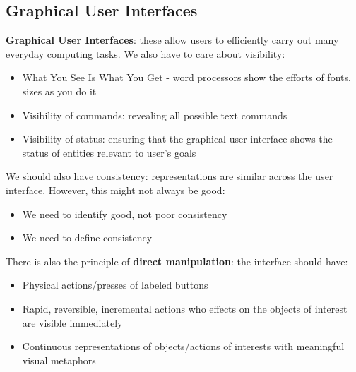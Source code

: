 \documentclass{article}
\begin{document}
\subsection{Graphical User Interfaces}
\textbf{Graphical User Interfaces}: these allow users to efficiently carry out many everyday computing tasks. We also have to care about visibility:
\begin{itemize}
    \item What You See Is What You Get - word processors show the efforts of fonts, sizes as you do it
    \item Visibility of commands: revealing all possible text commands
    \item Visibility of status: ensuring that the graphical user interface shows the status of entities relevant to user's goals
\end{itemize}
We should also have consistency: representations are similar across the user interface. However, this might not always be good:
\begin{itemize}
    \item We need to identify good, not poor consistency
    \item We need to define consistency
\end{itemize}
There is also the principle of \textbf{direct manipulation}: the interface should have:
\begin{itemize}
    \item Physical actions/presses of labeled buttons
    \item Rapid, reversible, incremental actions who effects on the objects of interest are visible immediately
    \item Continuous representations of objects/actions of interests with meaningful visual metaphors
\end{itemize}
\end{document}
